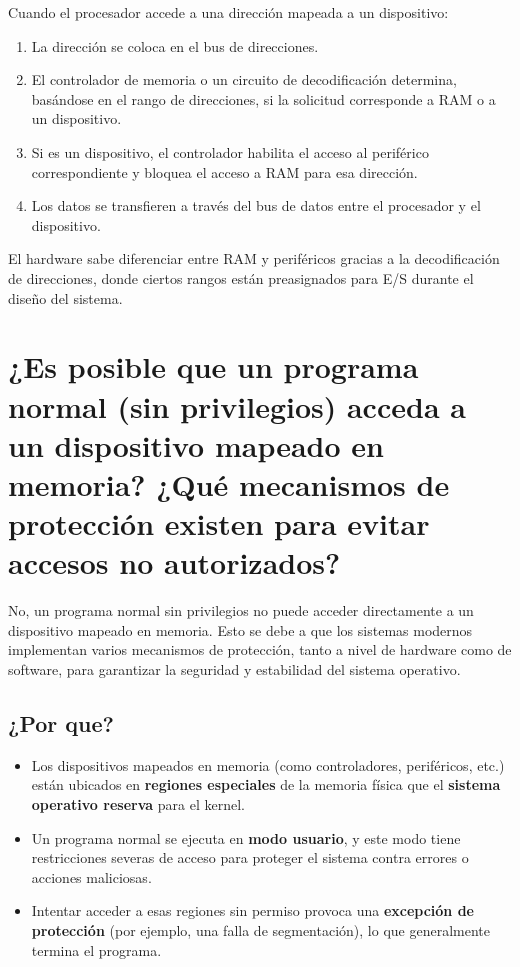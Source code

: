 \documentclass{article}
\begin{document}
\begin{itemize}
Cuando el procesador accede a una dirección mapeada a un dispositivo:
\begin{enumerate}
    \item La dirección se coloca en el bus de direcciones.
    \item El controlador de memoria o un circuito de decodificación determina, basándose en el rango de direcciones, si la solicitud corresponde a RAM o a un dispositivo.
    \item Si es un dispositivo, el controlador habilita el acceso al periférico correspondiente y bloquea el acceso a RAM para esa dirección.
    \item Los datos se transfieren a través del bus de datos entre el procesador y el dispositivo.
\end{enumerate}

El hardware sabe diferenciar entre RAM y periféricos gracias a la decodificación de direcciones, donde ciertos rangos están preasignados para E/S durante el diseño del sistema.

\section{¿Es posible que un programa normal (sin privilegios) acceda a un dispositivo mapeado en memoria? ¿Qué mecanismos de protección existen para evitar accesos no autorizados?}

No, un programa normal sin privilegios no puede acceder directamente a un dispositivo mapeado en memoria. Esto se debe a que los sistemas modernos implementan varios mecanismos de protección, tanto a nivel de hardware como de software, para garantizar la seguridad y estabilidad del sistema operativo.

\subsection*{¿Por que?}
\begin{itemize}
  \item Los dispositivos mapeados en memoria (como controladores, periféricos, etc.) están ubicados en \textbf{regiones especiales} de la memoria física que el \textbf{sistema operativo reserva} para el kernel.
  \item Un programa normal se ejecuta en \textbf{modo usuario}, y este modo tiene restricciones severas de acceso para proteger el sistema contra errores o acciones maliciosas.
  \item Intentar acceder a esas regiones sin permiso provoca una \textbf{excepción de protección} (por ejemplo, una falla de segmentación), lo que generalmente termina el programa.
\end{itemize}


\end{itemize}
\end{document}

